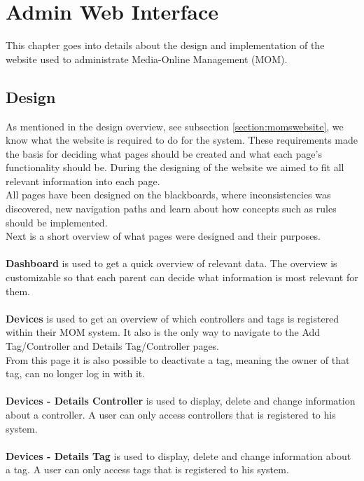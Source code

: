 \chapter{Admin Web Interface}
\label{chap:website}
This chapter goes into details about the design and implementation of the website used to administrate Media-Online Management (MOM).

\section{Design}
As mentioned in the design overview, see subsection \vref{section:momswebsite}, we know what the website is required to do for the system.
These requirements made the basis for deciding what pages should be created and what each page's functionality should be. During the designing of the website we aimed to fit all relevant information into each page.\\
All pages have been designed on the blackboards, where inconsistencies was discovered, new navigation paths and learn about how concepts such as rules should be implemented.\\
Next is a short overview of what pages were designed and their purposes.\\
\\
\textbf{Dashboard} is used to get a quick overview of relevant data. The overview is customizable so that each parent can decide what information is most relevant for them.\\
\\
\textbf{Devices} is used to get an overview of which controllers and tags is registered within their MOM system. It also is the only way to navigate to the Add Tag/Controller and Details Tag/Controller pages.\\
From this page it is also possible to deactivate a tag, meaning the owner of that tag, can no longer log in with it.\\
\\
\textbf{Devices - Details Controller} is used to display, delete and change information about a controller. A user can only access controllers that is registered to his system.\\
\\
\textbf{Devices - Details Tag} is used to display, delete and change information about a tag. A user can only access tags that is registered to his system.\\
\\
